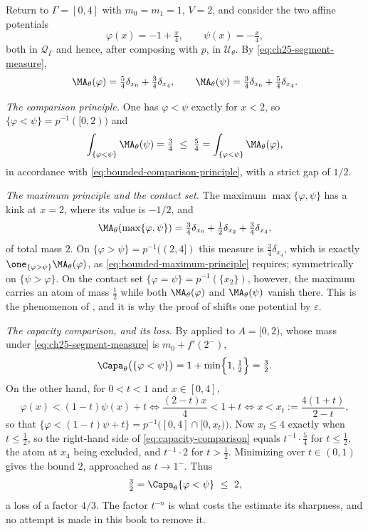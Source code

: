 \begin{example}
\label{ex:ch25-comparison-numbers}
Return to $\Gamma=[0,4]$ with $m_0=m_1=1$, $V=2$, and consider the two
affine potentials
\[
 \varphi(x)=-1+\tfrac x4,\qquad \psi(x)=-\tfrac x4,
\]
both in $\mathcal Q_\Gamma$ and hence, after composing with $p$, in
$\mathcal U_\theta$.  By \eqref{eq:ch25-segment-measure},
\[
 \MA_\theta(\varphi)=\tfrac54\delta_{x_0}+\tfrac34\delta_{x_4},
 \qquad
 \MA_\theta(\psi)=\tfrac34\delta_{x_0}+\tfrac54\delta_{x_4}.
\]

\emph{The comparison principle.}  One has $\varphi<\psi$ exactly for
$x<2$, so $\{\varphi<\psi\}=p^{-1}([0,2))$ and
\[
 \int_{\{\varphi<\psi\}}\MA_\theta(\psi)=\tfrac34
 \ \leq\ \tfrac54=\int_{\{\varphi<\psi\}}\MA_\theta(\varphi),
\]
in accordance with \eqref{eq:bounded-comparison-principle}, with a strict
gap of $1/2$.

\emph{The maximum principle and the contact set.}  The maximum
$\max\{\varphi,\psi\}$ has a kink at $x=2$, where its value is
$-1/2$, and
\[
 \MA_\theta(\max\{\varphi,\psi\})
 =\tfrac34\delta_{x_0}+\tfrac12\delta_{x_2}+\tfrac34\delta_{x_4},
\]
of total mass $2$.  On $\{\varphi>\psi\}=p^{-1}((2,4])$ this measure is
$\tfrac34\delta_{x_4}$, which is exactly
$\one_{\{\varphi>\psi\}}\MA_\theta(\varphi)$, as
\eqref{eq:bounded-maximum-principle} requires; symmetrically on
$\{\psi>\varphi\}$.  On the contact set
$\{\varphi=\psi\}=p^{-1}(\{x_2\})$, however, the maximum carries an atom of
mass $\tfrac12$ while both $\MA_\theta(\varphi)$ and
$\MA_\theta(\psi)$ vanish there.  This is the phenomenon of
, and it is why the proof of
 shifts one potential by
$\varepsilon$.

\emph{The capacity comparison, and its loss.}  By
 applied to $A=[0,2)$, whose mass under
\eqref{eq:ch25-segment-measure} is $m_0+f'(2^-)$,
\[
 \Capa_\theta\bigl(\{\varphi<\psi\}\bigr)
 =1+\min\Bigl\{1,\tfrac12\Bigr\}=\tfrac32 .
\]
On the other hand, for $0<t<1$ and $x\in[0,4]$,
\[
 \varphi(x)<(1-t)\psi(x)+t
 \iff \frac{(2-t)x}{4}<1+t
 \iff x<x_t:=\frac{4(1+t)}{2-t},
\]
so that $\{\varphi<(1-t)\psi+t\}=p^{-1}\bigl([0,4]\cap[0,x_t)\bigr)$.  Now
$x_t\leq4$ exactly when $t\leq\tfrac12$, so the right-hand side of
\eqref{eq:capacity-comparison} equals $t^{-1}\cdot\tfrac54$ for
$t\leq\tfrac12$, the atom at $x_4$ being excluded, and
$t^{-1}\cdot2$ for $t>\tfrac12$.  Minimizing over $t\in(0,1)$ gives
the bound $2$, approached as $t\to1^-$.  Thus
\[
 \tfrac32=\Capa_\theta\{\varphi<\psi\}\ \leq\ 2 ,
\]
a loss of a factor $4/3$.  The factor $t^{-n}$ is what costs the
estimate its sharpness, and no attempt is made in this book to remove it.


\end{example}
